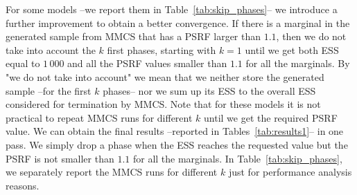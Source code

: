    For some models --we report them in Table~\ref{tab:skip_phases}-- we introduce a further improvement to obtain a better convergence. If there is a marginal in
   the generated sample from MMCS that has a PSRF larger than $1.1$, then we do not take into account the $k$ first phases, starting with $k=1$ until we get
   both ESS equal to $1\, 000$ and all the PSRF values smaller than $1.1$ for all the marginals. By "we do not take into account" we mean that  we neither store the generated sample --for the first $k$ phases-- nor we sum up its ESS to the
   overall ESS considered for termination by MMCS. Note that for these models it is not practical to repeat MMCS runs for different $k$ until we get the required PSRF value. We can obtain the final results --reported in
   Tables~\ref{tab:results1}-- in one pass. We simply drop a phase when the ESS
   reaches the requested value but the PSRF is not smaller than $1.1$ for all the
   marginals. In Table~\ref{tab:skip_phases}, we separately report the MMCS runs for different $k$ just for performance analysis reasons.


